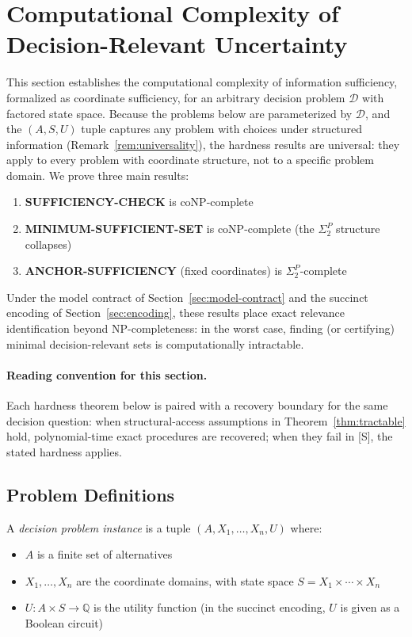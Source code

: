 \section{Computational Complexity of Decision-Relevant Uncertainty}
\label{sec:hardness}

This section establishes the computational complexity of information sufficiency, formalized as coordinate sufficiency, for an arbitrary decision problem $\mathcal{D}$ with factored state space. Because the problems below are parameterized by $\mathcal{D}$, and the $(A, S, U)$ tuple captures any problem with choices under structured information (Remark~\ref{rem:universality}), the hardness results are universal: they apply to every problem with coordinate structure, not to a specific problem domain. We prove three main results:

\begin{enumerate}
    \item \textbf{SUFFICIENCY-CHECK} is coNP-complete
    \item \textbf{MINIMUM-SUFFICIENT-SET} is coNP-complete (the $\Sigma_2^P$ structure collapses)
    \item \textbf{ANCHOR-SUFFICIENCY} (fixed coordinates) is $\Sigma_2^P$-complete
\end{enumerate}

Under the model contract of Section~\ref{sec:model-contract} and the succinct encoding of Section~\ref{sec:encoding}, these results place exact relevance identification beyond NP-completeness: in the worst case, finding (or certifying) minimal decision-relevant sets is computationally intractable.

\paragraph{Reading convention for this section.}
Each hardness theorem below is paired with a recovery boundary for the same decision question: when structural-access assumptions in Theorem~\ref{thm:tractable} hold, polynomial-time exact procedures are recovered; when they fail in [S], the stated hardness applies.

\subsection{Problem Definitions}

\begin{definition}
A \emph{decision problem instance} is a tuple $(A, X_1, \ldots, X_n, U)$ where:
\begin{itemize}
    \item $A$ is a finite set of alternatives
    \item $X_1, \ldots, X_n$ are the coordinate domains, with state space $S = X_1 \times \cdots \times X_n$
    \item $U: A \times S \to \mathbb{Q}$ is the utility function (in the succinct encoding, $U$ is given as a Boolean circuit)
\end{itemize}
\end{definition}

